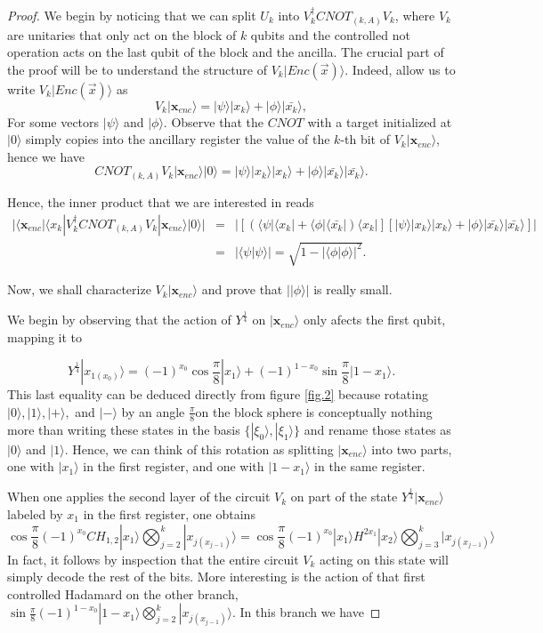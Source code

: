 \documentclass{article}
\theoremstyle{definition}
\newcommand{\ket}[1]{|#1\rangle}
\newcommand{\bra}[1]{\langle#1|}
\newcommand{\braket}[2]{\langle{#1}|{#2}\rangle}
\begin{document}
\begin{proof}
We begin by noticing that we can split $U_k$ into $V_k^\dagger CNOT_{(k,A)}V_k$, where $V_k$ are unitaries that only act on the block of $k$ qubits and the controlled not operation acts on the last qubit of the block and the ancilla. The crucial part of the proof will be to understand the structure of  $V_k\ket{Enc(\vec{x})}$. Indeed, allow us to write  $V_k\ket{Enc(\vec{x})}$ as
\[V_k\ket{\textbf{x}_{enc}}=\ket{\psi}\ket{x_k}+\ket{\phi}\ket{\bar{x_k}},\]
For some vectors $\ket{\psi}$ and $\ket{\phi}$. Observe that the $CNOT$ with a target initialized at $\ket{0}$ simply copies into the ancillary register the value of the $k$-th bit of $V_k\ket{\textbf{x}_{enc}}$, hence we have
\begin{equation}
CNOT_{(k,A)}V_k\ket{\textbf{x}_{enc}}\ket{0}=\ket{\psi}\ket{x_k}\ket{x_k}+\ket{\phi}\ket{\bar{x_k}}\ket{\bar{x_k}}.
\end{equation}

Hence, the inner product that we are interested in reads
\begin{eqnarray}
|\bra{\textbf{x}_{enc}}\bra{x_k}V_k^\dagger CNOT_{(k,A)}V_k\ket{\textbf{x}_{enc}}\ket{0}|&=&|\left[\left(\bra{\psi}\bra{x_k}+\bra{\phi}\bra{\bar{x_k}}\right)\bra{x_k}\right]\left[\ket{\psi}\ket{x_k}\ket{x_k}+\ket{\phi}\ket{\bar{x_k}}\ket{\bar{x_k}}\right]|\\
&=&|\braket{\psi}{\psi}|=\sqrt{1-|\braket{\phi}{\phi}|^2}.
\end{eqnarray}

Now, we shall characterize $V_k\ket{\textbf{x}_{enc}}$ and prove that $|\ket{\phi}|$ is really small.

We begin by observing that the action of $Y^{\frac{1}{4}}$ on $\ket{\textbf{x}_{enc}}$ only afects the first qubit, mapping it to

\[Y^\frac{1}{4}\ket{x_{1(x_0)}}=(-1)^{x_0}\cos\frac{\pi}{8}\ket{x_1}+(-1)^{1-x_0}\sin\frac{\pi}{8}\ket{1-x_1}.\]
This last equality can be deduced directly from figure \ref{fig.2} because rotating $\ket{0}, \ket{1}, \ket{+},$ and $\ket{-}$ by an angle $\frac{\pi}{8}$on the block sphere is conceptually nothing more than writing these states in the basis $\{\ket{\xi_0}, \ket{\xi_1}\}$ and rename those states as $\ket{0}$ and $\ket{1}$. Hence, we can think of this rotation as splitting $\ket{\textbf{x}_{enc}}$ into two parts, one with $\ket{x_1}$ in the first register, and one with $\ket{1-x_1}$ in the same register.

When one applies the second layer of the circuit $V_k$ on part of the state $Y^{\frac{1}{4}}\ket{\textbf{x}_{enc}}$ labeled by $x_1$ in the first register, one obtains 
\[\cos\frac{\pi}{8}(-1)^{x_0}CH_{1,2}\ket{x_1}\bigotimes_{j=2}^k\ket{x_{j(x_{j-1})}}=\cos\frac{\pi}{8}(-1)^{x_0}\ket{x_1}H^{2 x_1}\ket{x_2}\bigotimes_{j=3}^k\ket{x_{j(x_{j-1})}}\]
In fact, it follows by inspection that the entire circuit $V_k$ acting on this state will simply decode the rest of the bits. More interesting is the action of that first controlled Hadamard on the other branch, $\sin\frac{\pi}{8}(-1)^{1-x_0}\ket{1-x_1}\bigotimes_{j=2}^k\ket{x_{j(x_{j-1})}}$. In this branch we have


\end{proof}
\end{document}
